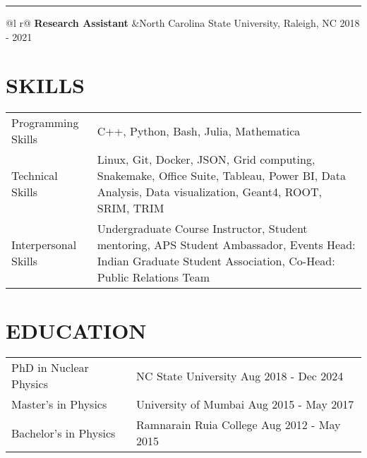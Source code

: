\documentclass[a4paper,12pt]{article}
\begin{document}
\hrule
\begin{tabularx}{\linewidth}{ @{}l r@{} }
\textbf{Research Assistant} &North Carolina State University, Raleigh, NC \hfill 2018 - 2021 \\[3pt]
\end{tabularx}

\section{\textbf{SKILLS}}
\begin{tabularx}{\linewidth}{@{}l X@{}}
Programming Skills &  \normalsize{C++, Python, Bash, Julia, Mathematica}\\
Technical Skills & \normalsize{Linux, Git, Docker, JSON, Grid computing, Snakemake, Office Suite, Tableau, Power BI, Data Analysis, Data visualization, Geant4, ROOT, SRIM, TRIM}\\
Interpersonal Skills  &  \normalsize{Undergraduate Course Instructor, Student mentoring, APS Student Ambassador, Events Head: Indian Graduate Student Association, Co-Head: Public Relations Team}
\end{tabularx}
\section{\textbf{EDUCATION}}
\begin{tabularx}{\linewidth}{@{}l X@{}}	
PhD in Nuclear Physics & NC State University \hfill Aug 2018 - Dec 2024 \\
Master's in Physics & University of Mumbai \hfill Aug 2015 - May 2017 \\ 
Bachelor's in Physics & Ramnarain Ruia College \hfill  Aug 2012 - May 2015 \\
\end{tabularx}
\end{document}
